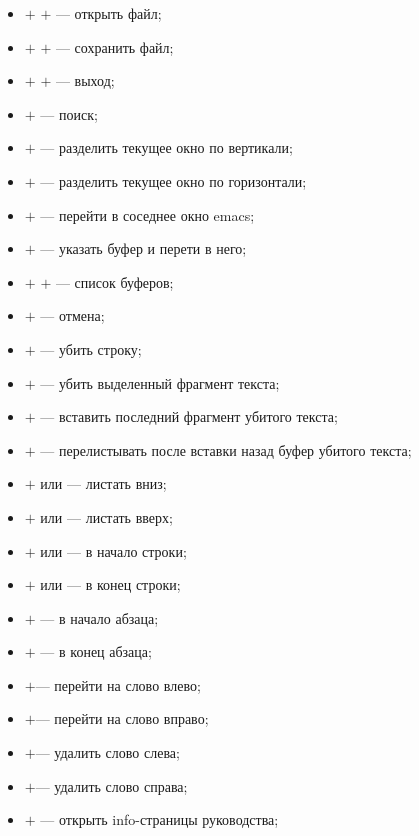 \begin{itemize}
  \item \Ctrl$+$ \Ctrl$+$  --- открыть файл;
  \item \Ctrl$+$ \Ctrl$+$  --- сохранить файл;
  \item \Ctrl$+$ \Ctrl$+$  --- выход;
  \item \Ctrl$+$           --- поиск;
  \item \Ctrl$+$   --- разделить текущее окно по вертикали;
  \item \Ctrl$+$   --- разделить текущее окно по горизонтали;
  \item \Ctrl$+$   --- перейти в соседнее окно emacs;
  \item \Ctrl$+$   --- указать буфер и перети в него;
  \item \Ctrl$+$ \Ctrl$+$  --- список буферов;
  \item \Ctrl$+$   --- отмена;
  \item \Ctrl$+$  --- убить строку;
  \item \Ctrl$+$  --- убить выделенный фрагмент текста;
  \item \Ctrl$+$  --- вставить последний фрагмент убитого текста;
  \item \Alt$+$   --- перелистывать после вставки назад буфер убитого текста;
  \item \Ctrl$+$ или \PgDown  --- листать вниз;
  \item \Alt$+$  или \PgUp    --- листать вверх;
  \item \Ctrl$+$ или \Home  --- в начало строки;
  \item \Ctrl$+$ или \End   --- в конец строки;
  \item \Alt$+$  --- в начало абзаца;
  \item \Alt$+$  --- в конец абзаца;
  \item \Ctrl$+$\LArrow  --- перейти на слово влево;
  \item \Ctrl$+$\RArrow  --- перейти на слово вправо;
  \item \Ctrl$+$\BSpace  --- удалить слово слева;
  \item \Ctrl$+$\Del     --- удалить слово справа;
  \item \Ctrl$+$   --- открыть info-страницы руководства;
\end{itemize}

